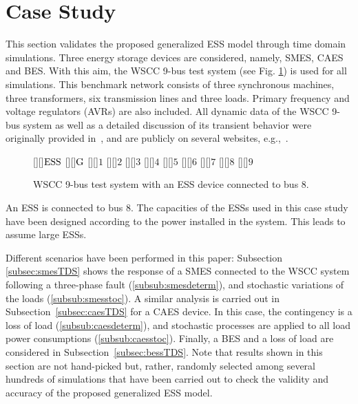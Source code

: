 \documentclass[journal, a4paper]{IEEEtran}
\begin{document}
\section{Case Study}
\label{sec:case}

This section validates the proposed generalized ESS model through time
domain simulations. Three energy storage devices are considered,
namely, SMES, CAES and BES. With this aim, the WSCC 9-bus test system
(see Fig. \ref{9bus}) is used for all simulations.  This benchmark
network consists of three synchronous machines, three transformers,
six transmission lines and three loads.  Primary frequency and voltage
regulators (AVRs) are also included. 
All dynamic data of the WSCC
9-bus system as well as a detailed discussion of its transient
behavior were originally provided in~\cite{Anderson:03}, and 
are publicly on several websites, e.g.,~\cite{web:9bus}.

\begin{figure}[h!]
  \begin{center}
    [][]{\Large $\rm ESS$}
    [][]{\Large $\rm G$}
    [][]{\Large $1$}
    [][]{\Large $2$}
    [][]{\Large $3$}
    [][]{\Large $4$}
    [][]{\Large $5$}
    [][]{\Large $6$}
    [][]{\Large $7$}
    [][]{\Large $8$}
    [][]{\Large $9$}
    \caption{WSCC 9-bus test system with an ESS device connected to bus 8.}
    \label{9bus}
  \end{center}
\vspace{-0.4cm}
\end{figure}

An ESS is connected to bus 8.  The capacities of the ESSs used in this
case study have been designed according to the power installed in the
system.  This leads to assume large ESSs. 



Different scenarios have been performed in this paper: Subsection
\ref{subsec:smesTDS} shows the response of a SMES connected to the
WSCC system following a three-phase fault (\ref{subsub:smesdeterm}), 
and stochastic variations of the loads (\ref{subsub:smesstoc}).
A similar analysis is carried out in Subsection~\ref{subsec:caesTDS} for a CAES device.
In this case, the contingency is a loss of load (\ref{subsub:caesdeterm}),
and stochastic processes are applied to all load power consumptions (\ref{subsub:caesstoc}).
Finally, a BES and a loss of load are considered in Subsection~\ref{subsec:bessTDS}.
Note that results shown in this section are not hand-picked but, rather, randomly
selected among several hundreds of simulations that have been carried out to check
the validity and accuracy of the proposed generalized ESS model.
\end{document}
